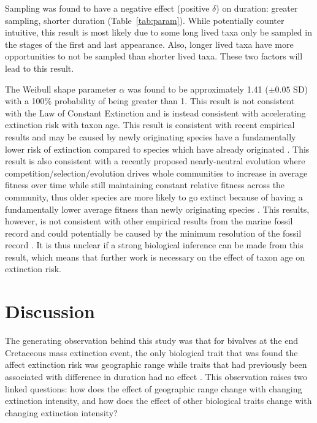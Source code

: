 \documentclass[11pt]{article}
\begin{document}
Sampling was found to have a negative effect (positive \(\delta\)) on duration: greater sampling, shorter duration (Table~\ref{tab:param}). While potentially counter intuitive, this result is most likely due to some long lived taxa only be sampled in the stages of the first and last appearance. Also, longer lived taxa have more opportunities to not be sampled than shorter lived taxa. These two factors will lead to this result. 

The Weibull shape parameter \(\alpha\) was found to be approximately 1.41 (\(\pm 0.05\) SD) with a 100\% probability of being greater than 1. This result is not consistent with the Law of Constant Extinction \citep{VanValen1973} and is instead consistent with accelerating extinction risk with taxon age. This result is consistent with recent empirical results and may be caused by newly originating species have a fundamentally lower risk of extinction compared to species which have already originated \citep{Wagner2014b,Quental2013,Smits2015}. This result is also consistent with a recently proposed nearly-neutral evolution where competition/selection/evolution drives whole communities to increase in average fitness over time while still maintaining constant relative fitness across the community, thus older species are more likely to go extinct because of having a fundamentally lower average fitness than newly originating species \citep{Rosindell2015a}. This results, however, is not consistent with other empirical results from the marine fossil record \citep{Finnegan2008,Crampton2016} and could potentially be caused by the minimum resolution of the fossil record \citep{Sepkoski1975}. It is thus unclear if a strong biological inference can be made from this result, which means that further work is necessary on the effect of taxon age on extinction risk.



\section*{Discussion}



The generating observation behind this study was that for bivalves at the end Cretaceous mass extinction event, the only biological trait that was found the affect extinction risk was geographic range while traits that had previously been associated with difference in duration had no effect \citep{Jablonski1986}. This observation raises two linked questions: how does the effect of geographic range change with changing extinction intensity, and how does the effect of other biological traits change with changing extinction intensity?
\end{document}
